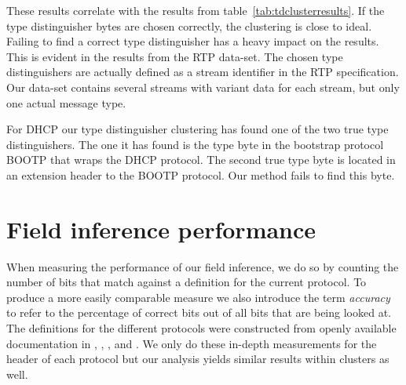 \documentclass[a4paper]{report}
\begin{document}
These results correlate with the results from table~\ref{tab:tdclusterresults}.
If the type distinguisher bytes are chosen correctly, the clustering is close
to ideal. Failing to find a correct type distinguisher has a heavy impact on
the results. This is evident in the results from the RTP data-set. The chosen
type distinguishers are actually defined as a stream identifier in the RTP
specification. Our data-set contains several streams with variant data for
each stream, but only one actual message type.

For DHCP our type distinguisher clustering has found one of the two true
type distinguishers. The one it has found is the type byte in the
bootstrap protocol BOOTP that wraps the DHCP protocol. The second true type
byte is located in an extension header to the BOOTP protocol. Our method fails
to find this byte.


\section{Field inference performance}
\label{sec:fieldperf}
%
When measuring the performance of our field inference, we do so by counting the
number of bits that match against a definition for the current protocol. To
produce a more easily comparable measure we also introduce the term
\emph{accuracy} to refer to the percentage of correct bits out of all bits that
are being looked at. The definitions for the different protocols were
constructed from openly available documentation in ,
, , 
and . We only do these in-depth measurements for the
header of each protocol but our analysis yields similar results within clusters
as well.
\end{document}
